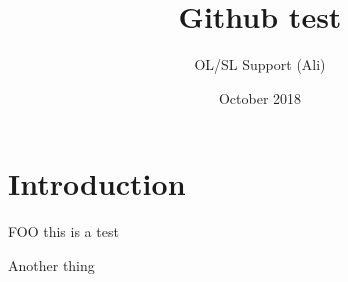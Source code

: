 \documentclass{article}
\title{Github test}
\author{OL/SL Support (Ali) }
\date{October 2018}
\begin{document}
\maketitle

\section{Introduction}

FOO this is a test

Another thing
\end{document}
